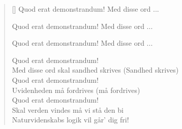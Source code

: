 \begin{multicols}{2}
\begin{verse}[\versewidth]
Quod erat demonstrandum! Med disse ord ...

Quod erat demonstrandum! Med disse ord ...

Quod erat demonstrandum! Med disse ord ...

Quod erat demonstrandum!\\
Med disse ord skal sandhed skrives (Sandhed skrives)\\
Quod erat demonstrandum!\\
Uvidenheden må fordrives (må fordrives)\\
Quod erat demonstrandum!\\
Skal verden vindes må vi stå den bi\\
Naturvidenskabs logik vil går' dig fri!
\end{verse}
\end{multicols}
\newpage


